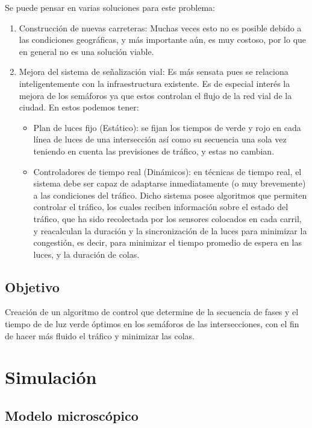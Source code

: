 \documentclass[twoside,twocolumn]{article} %
\begin{document}
	\vspace{0.5em}
	Se puede pensar en varias soluciones para este problema:
	\begin{enumerate}
		\item Construcción de nuevas carreteras: Muchas veces esto no es posible debido a las condiciones geográficas, y más importante aún, es muy costoso, por lo que en general no es una solución viable.
		\item Mejora del sistema de señalización vial: Es más sensata pues se relaciona inteligentemente con la infraestructura existente. Es de especial interés la mejora de los semáforos ya que estos controlan el flujo de la red vial de la ciudad. En estos podemos tener:
		\begin{itemize}
			\item Plan de luces fijo (Estático): se fijan los tiempos de verde y rojo en cada línea de luces de una intersección así como su secuencia una sola vez teniendo en cuenta las previsiones de tráfico, y estas no cambian.
			\item Controladores de tiempo real (Dinámicos): en técnicas de tiempo real, el sistema debe ser capaz de adaptarse inmediatamente (o muy brevemente) a las condiciones del tráfico. Dicho sistema posee algoritmos que permiten controlar el tráfico, los cuales reciben información sobre el estado del tráfico, que ha sido recolectada por los sensores colocados en cada carril, y reacalculan la duración y la sincronización de la luces para minimizar la congestión, es decir, para minimizar el tiempo promedio de espera en las luces, y la duración de colas.
		\end{itemize} 
	\end{enumerate}

	\subsection{Objetivo}
	
	Creación de un algoritmo de control que determine de la secuencia de fases y el tiempo de de luz verde óptimos en los semáforos de las intersecciones, con el fin de hacer más fluido el tráfico y minimizar las colas.
	
	\section{Simulación}
	
	\subsection{Modelo microscópico}
	
\end{document}
